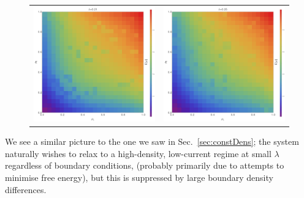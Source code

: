 \begin{figure}
\begin{center}
\begin{tabular}{c c}
\includegraphics[width=0.49\linewidth]{numerics/images/concFrames/concDataDens0p21.png} &
\includegraphics[width=0.49\linewidth]{numerics/images/concFrames/concDataDens0p25.png} \\
\end{tabular}
\end{center}
\end{figure}

We see a similar picture to the one we saw in Sec.~\ref{sec:constDens}; the system naturally 
wishes to relax to a high-density, low-current regime at small $\lambda$ regardless of boundary 
conditions, (probably primarily due to attempts to minimise free energy), but this is suppressed by
large boundary density differences.


